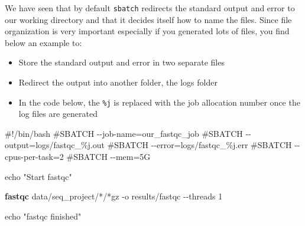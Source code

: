 \documentclass[
  letterpaper,
  DIV=11,
  numbers=noendperiod]{scrreprt}
\newenvironment{Shaded}{}{}
\newcommand{\AttributeTok}[1]{\textcolor[rgb]{0.84,0.23,0.29}{#1}}
\newcommand{\BuiltInTok}[1]{\textcolor[rgb]{0.84,0.23,0.29}{#1}}
\newcommand{\CommentTok}[1]{\textcolor[rgb]{0.42,0.45,0.49}{#1}}
\newcommand{\ExtensionTok}[1]{\textcolor[rgb]{0.84,0.23,0.29}{\textbf{#1}}}
\newcommand{\NormalTok}[1]{\textcolor[rgb]{0.14,0.16,0.18}{#1}}
\newcommand{\PreprocessorTok}[1]{\textcolor[rgb]{0.84,0.23,0.29}{#1}}
\newcommand{\StringTok}[1]{\textcolor[rgb]{0.01,0.18,0.38}{#1}}
\providecommand{\tightlist}{%
  \setlength{\itemsep}{0pt}\setlength{\parskip}{0pt}}\usepackage{longtable,booktabs,array}
\begin{document}
\begin{tcolorbox}[enhanced jigsaw, opacitybacktitle=0.6, titlerule=0mm, colbacktitle=quarto-callout-tip-color!10!white, arc=.35mm, leftrule=.75mm, colframe=quarto-callout-tip-color-frame, opacityback=0, bottomtitle=1mm, toprule=.15mm, coltitle=black, toptitle=1mm, title=\textcolor{quarto-callout-tip-color}{\faLightbulb}\hspace{0.5em}{Tip: sbatch and better log files}, breakable, rightrule=.15mm, bottomrule=.15mm, colback=white, left=2mm]

We have seen that by default \texttt{sbatch} redirects the standard
output and error to our working directory and that it decides itself how
to name the files. Since file organization is very important especially
if you generated lots of files, you find below an example to:

\begin{itemize}
\tightlist
\item
  Store the standard output and error in two separate files
\item
  Redirect the output into another folder, the logs folder
\item
  In the code below, the \texttt{\%j} is replaced with the job
  allocation number once the log files are generated
\end{itemize}

\begin{Shaded}
\begin{Highlighting}[]
\CommentTok{\#!/bin/bash}
\CommentTok{\#SBATCH {-}{-}job{-}name=our\_fastqc\_job}
\CommentTok{\#SBATCH {-}{-}output=logs/fastqc\_\%j.out}
\CommentTok{\#SBATCH {-}{-}error=logs/fastqc\_\%j.err}
\CommentTok{\#SBATCH {-}{-}cpus{-}per{-}task=2}
\CommentTok{\#SBATCH {-}{-}mem=5G}

\BuiltInTok{echo} \StringTok{"Start fastqc"}

\ExtensionTok{fastqc}\NormalTok{ data/seq\_project/}\PreprocessorTok{*}\NormalTok{/}\PreprocessorTok{*}\NormalTok{gz }\AttributeTok{{-}o}\NormalTok{ results/fastqc  }\AttributeTok{{-}{-}threads}\NormalTok{ 1}

\BuiltInTok{echo} \StringTok{"fastqc finished"}
\end{Highlighting}
\end{Shaded}

\end{tcolorbox}
\end{document}
